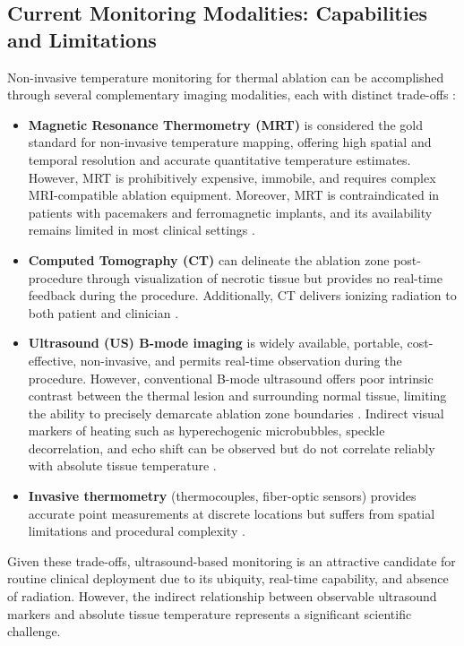 \subsection{Current Monitoring Modalities: Capabilities and Limitations}

Non-invasive temperature monitoring for thermal ablation can be accomplished through several complementary imaging modalities, each with distinct trade-offs \cite{geoghegan2022}:

\begin{itemize}
    \item \textbf{Magnetic Resonance Thermometry (MRT)} is considered the gold standard for non-invasive temperature mapping, offering high spatial and temporal resolution and accurate quantitative temperature estimates.
    However, MRT is prohibitively expensive, immobile, and requires complex MRI-compatible ablation equipment. Moreover, MRT is contraindicated in patients with pacemakers and ferromagnetic implants, and its availability remains limited in most clinical settings \cite{vogl2017, geoghegan2022}.

    \item \textbf{Computed Tomography (CT)} can delineate the ablation zone post-procedure through visualization of necrotic tissue but provides no real-time feedback during the procedure.
    Additionally, CT delivers ionizing radiation to both patient and clinician \cite{geoghegan2022}.

    \item \textbf{Ultrasound (US) B-mode imaging} is widely available, portable, cost-effective, non-invasive, and permits real-time observation during the procedure.
    However, conventional B-mode ultrasound offers poor intrinsic contrast between the thermal lesion and surrounding normal tissue, limiting the ability to precisely demarcate ablation zone boundaries \cite{zhang2020, geoghegan2022}.
    Indirect visual markers of heating such as hyperechogenic microbubbles, speckle decorrelation, and echo shift can be observed but do not correlate reliably with absolute tissue temperature \cite{seip2002}.

    \item \textbf{Invasive thermometry} (thermocouples, fiber-optic sensors) provides accurate point measurements at discrete locations but suffers from spatial limitations and procedural complexity \cite{geoghegan2022}.
\end{itemize}

Given these trade-offs, ultrasound-based monitoring is an attractive candidate for routine clinical deployment due to its ubiquity, real-time capability, and absence of radiation.
However, the indirect relationship between observable ultrasound markers and absolute tissue temperature represents a significant scientific challenge.

